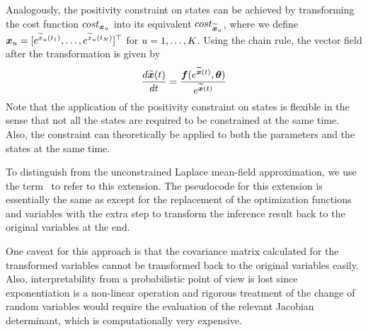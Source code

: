Analogously, the positivity constraint on states can be achieved by transforming the cost function $cost_{\boldsymbol{x}_{u}}$ into its equivalent $cost_{\boldsymbol{\widetilde{x}}_{u}}$, where we define $\boldsymbol{x}_{u} = [e^{\widetilde{x}_{u}(t_{1})},\dots,e^{\widetilde{x}_{u}(t_{N})}]^\top$ for $u = 1,\dots,K$.
Using the chain rule, the vector field after the transformation is given by
\begin{align}
    \frac{d\boldsymbol{\widetilde{x}}(t)}{dt}
    =  
    \frac{
        \boldsymbol{f}(
        e^{\boldsymbol{\widetilde{x}}(t)}, \boldsymbol{\theta})}{e^{\boldsymbol{\widetilde{x}}(t)}}
\end{align}
Note that the application of the positivity constraint on states is flexible in the sense that not all the states are required to be constrained at the same time.
Also, the constraint can theoretically be applied to both the parameters and the states at the same time.

To distinguish from the unconstrained Laplace mean-field approximation, we use the term \algolpmfpos\ to refer to this extension.
The pseudocode for this extension is essentially the same as  except for the replacement of the optimization functions and variables with the extra step to transform the inference result back to the original variables at the end.

One caveat for this approach is that the covariance matrix calculated for the transformed variables cannot be transformed back to the original variables easily.
Also, interpretability from a probabilistic point of view is lost since exponentiation is a non-linear operation and rigorous treatment of the change of random variables would require the evaluation of the relevant Jacobian determinant, which is computationally very expensive.
